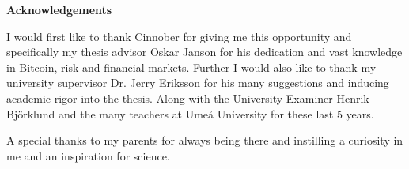 \vspace*{7cm}

\begin{center}
	\textbf{Acknowledgements}
\end{center} 

I would first like to thank Cinnober for giving me this opportunity and specifically my thesis advisor Oskar Janson for his dedication and vast knowledge in Bitcoin, risk and financial markets.
Further I would also like to thank my university supervisor Dr. Jerry Eriksson for his many suggestions and inducing academic rigor into the thesis. Along with the University Examiner Henrik Bj\"{o}rklund and the many teachers at Umeå University for these last 5 years. 
  
A special thanks to my parents for always being there and instilling a curiosity in me and an inspiration for science. 
